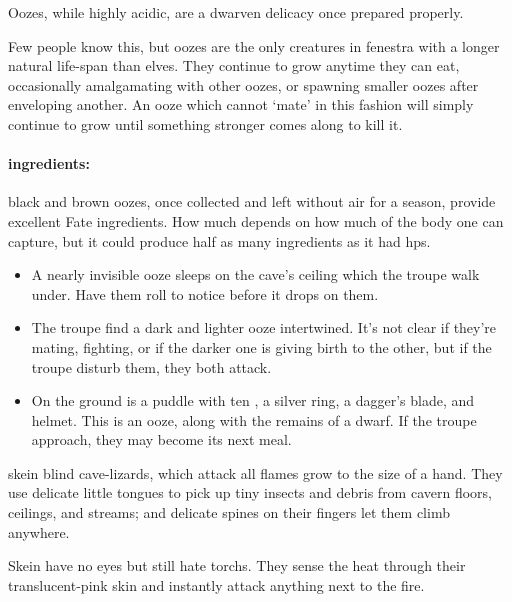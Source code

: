 \begin{multicols}{2}
Oozes, while highly acidic, are a dwarven delicacy once prepared properly.

Few people know this, but oozes are the only creatures in \gls{fenestra} with a longer natural life-span than elves.
They continue to grow anytime they can eat, occasionally amalgamating with other oozes, or spawning smaller oozes after enveloping another.
An ooze which cannot `mate' in this fashion will simply continue to grow until something stronger comes along to kill it.

\jelly

\paragraph{\Glspl{ingredient}:}
black and brown oozes, once collected and left without air for a season, provide excellent Fate \glspl{ingredient}.
How much depends on how much of the body one can capture, but it could produce half as many \glspl{ingredient} as it had \glspl{hp}.

\showEnc

\begin{itemize}
  \item
  A nearly invisible ooze sleeps on the cave's ceiling which the troupe walk under.
  Have them roll  to notice before it drops on them.
  \item
  The troupe find a dark and lighter ooze intertwined.
  It's not clear if they're mating, fighting, or if the darker one is giving birth to the other, but if the troupe disturb them, they both attack.
  \item
  On the ground is a puddle with ten , a silver ring, a dagger's blade, and helmet.
  This is an ooze, along with the remains of a dwarf.
  If the troupe approach, they may become its next meal.
\end{itemize}

\jelly

  {skein}%
  {blind cave-lizards, which attack all flames}%
grow to the size of a hand.
They use delicate little tongues to pick up tiny insects and debris from cavern floors, ceilings, and streams; and delicate spines on their fingers let them climb anywhere.

\skeinSwarm

Skein have no eyes but still hate \glspl{torch}.
They sense the heat through their translucent-pink skin and instantly attack anything next to the fire.


\end{multicols}
